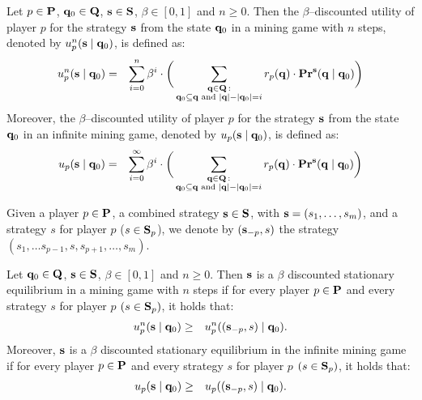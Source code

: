 \begin{mydef}
Let $p \in \mathbf{P}$, $\mathbf{q}_0 \in \mathbf{Q}$, $\mathbf{s} \in \mathbf{S}$, $\beta \in [0,1]$ and $n \geq 0$. Then the $\beta$--discounted utility of player $p$ for the strategy $\mathbf{s}$ from the state $\mathbf{q}_0$ in a mining game with $n$ steps, denoted by $u_p^n(\mathbf{s} \mid \mathbf{q}_0)$, is defined as:
\begin{eqnarray*}
u_p^n(\mathbf{s} \mid \mathbf{q}_0) & = & \sum_{i=0}^{n}\beta^{i} \cdot  \bigg(\sum_{\substack{\mathbf{q} \in \mathbf{Q} \,: \\ \mathbf{q}_0 \subseteq \mathbf{q} \text{ {\rm and} } |\mathbf{q}| - |\mathbf{q}_0| = i}} r_p(\mathbf{q}) \cdot 
\mathbf{Pr}^{\mathbf{s}}(\mathbf{q} \mid \mathbf{q}_0)\bigg)
\end{eqnarray*}
Moreover, the $\beta$--discounted utility of player $p$ for the strategy $\mathbf{s}$ from the state $\mathbf{q}_0$ in an infinite mining game, denoted by $u_p(\mathbf{s} \mid \mathbf{q}_0)$, is defined as:
\begin{eqnarray*}
u_p(\mathbf{s} \mid \mathbf{q}_0) & = & \sum_{i=0}^{\infty}\beta^{i} \cdot  \bigg(\sum_{\substack{\mathbf{q} \in \mathbf{Q} \,: \\ \mathbf{q}_0 \subseteq \mathbf{q} \text{ {\rm and} } |\mathbf{q}| - |\mathbf{q}_0| = i}} r_p(\mathbf{q}) \cdot 
\mathbf{Pr}^{\mathbf{s}}(\mathbf{q} \mid \mathbf{q}_0)\bigg)
\end{eqnarray*}
\end{mydef}
Given a player $p \in \mathbf{P}$, a combined strategy $\mathbf{s} \in \mathbf{S}$, with $\mathbf{s} = (s_1, \ldots, s_m)$, and a strategy $s$ for player $p$ ($s \in \mathbf{S}_p$), we denote by $(\mathbf{s}_{-p}, s)$ the strategy $(s_1, \ldots s_{p-1},s,s_{p+1}, \ldots, s_{m})$.
\begin{mydef}
Let $\mathbf{q}_0 \in \mathbf{Q}$, $\mathbf{s} \in \mathbf{S}$, $\beta \in [0,1]$ and $n \geq 0$. Then $\mathbf{s}$ is a $\beta$ discounted stationary equilibrium in a mining game with $n$ steps if for every player $p \in \mathbf{P}$ and every strategy $s$ for player $p$ $(s \in\mathbf{S}_p)$, it holds that:
\begin{eqnarray*}
u_p^n(\mathbf{s} \mid \mathbf{q}_0)  & \geq  & u_p^n((\mathbf{s}_{-p},s) \mid \mathbf{q}_0).
\end{eqnarray*}
Moreover, $\mathbf{s}$ is a $\beta$ discounted stationary equilibrium  in  the infinite mining game if for every player $p \in \mathbf{P}$ and every strategy $s$ for player $p$ $(s \in\mathbf{S}_p)$, it holds that:
\begin{eqnarray*}u_p(\mathbf{s} \mid \mathbf{q}_0)  & \geq  & u_p ((\mathbf{s}_{-p},s) \mid \mathbf{q}_0).
\end{eqnarray*}
\end{mydef}

